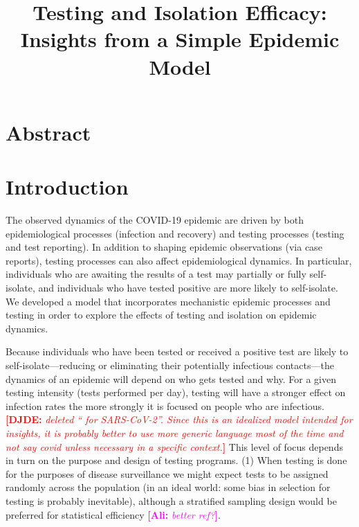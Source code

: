 \documentclass[12pt]{article}
\title{Testing and Isolation Efficacy: Insights from a Simple Epidemic Model}
\newcommand{\comment}{\showcomment}
\newcommand{\showcomment}[3]{\textcolor{#1}{\textbf{[#2: }\textsl{#3}\textbf{]}}}
\newcommand{\ali}[1]{\comment{magenta}{Ali}{#1}}
\newcommand{\david}[1]{\comment{red}{DJDE}{#1}}
\theoremstyle{definition} %
\begin{document}
\maketitle

\linenumbers

\section{Abstract}

\section{Introduction}

The observed dynamics of the COVID-19 epidemic are driven by both epidemiological processes (infection and recovery) and testing processes (testing and test reporting). In addition to shaping epidemic observations (via case reports), testing processes can also affect epidemiological dynamics. In particular, individuals who are awaiting the results of a test may partially or fully self-isolate, and individuals who have tested positive are more likely to self-isolate. We developed a model that incorporates mechanistic epidemic processes and testing in order to explore the effects of testing and isolation on epidemic dynamics.

Because individuals who have been tested or received a positive test are likely to self-isolate---reducing or eliminating  their potentially infectious contacts---the dynamics of an epidemic will depend on who gets tested and
why. For a given testing intensity (tests performed per day), testing will have a stronger effect on infection rates
the more strongly it is focused on people who are infectious.\david{deleted `` for SARS-CoV-2''.  Since this is an idealized model intended for insights, it is probably better to use more generic language most of the time and not say covid unless necessary in a specific context.}
This level of focus depends in turn on the purpose and design of testing programs.
(1) When testing is done for the purposes of disease surveillance \citep{foddai2020base}
we might expect tests to be assigned randomly across the population (in an ideal world: some bias in selection for testing is probably inevitable), although a stratified sampling design would be preferred for statistical efficiency \citep{graubard1996modelling} \ali{better ref?}.
\end{document}
